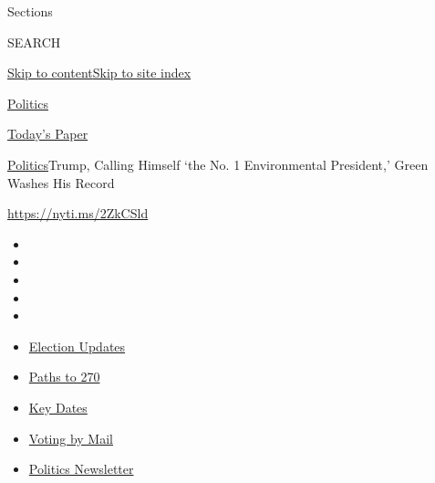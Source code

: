Sections

SEARCH

\protect\hyperlink{site-content}{Skip to
content}\protect\hyperlink{site-index}{Skip to site index}

\href{https://www.nytimes3xbfgragh.onion/section/politics}{Politics}

\href{https://myaccount.nytimes3xbfgragh.onion/auth/login?response_type=cookie\&client_id=vi}{}

\href{https://www.nytimes3xbfgragh.onion/section/todayspaper}{Today's
Paper}

\href{/section/politics}{Politics}\textbar{}Trump, Calling Himself `the
No. 1 Environmental President,' Green Washes His Record

\url{https://nyti.ms/2ZkCSld}

\begin{itemize}
\item
\item
\item
\item
\item
\end{itemize}

\begin{itemize}
\item
  \href{https://www.nytimes3xbfgragh.onion/live/2020/09/11/us/trump-vs-biden?action=click\&pgtype=Article\&state=default\&region=TOP_BANNER\&context=storylines_menu}{Election
  Updates}
\item
  \href{https://www.nytimes3xbfgragh.onion/interactive/2020/us/elections/election-states-biden-trump.html?action=click\&pgtype=Article\&state=default\&region=TOP_BANNER\&context=storylines_menu}{Paths
  to 270}
\item
  \href{https://www.nytimes3xbfgragh.onion/interactive/2019/us/elections/2020-presidential-election-calendar.html?action=click\&pgtype=Article\&state=default\&region=TOP_BANNER\&context=storylines_menu}{Key
  Dates}
\item
  \href{https://www.nytimes3xbfgragh.onion/interactive/2020/08/31/us/politics/vote-by-mail-deadlines.html?action=click\&pgtype=Article\&state=default\&region=TOP_BANNER\&context=storylines_menu}{Voting
  by Mail}
\item
  \href{https://www.nytimes3xbfgragh.onion/newsletters/politics?action=click\&pgtype=Article\&state=default\&region=TOP_BANNER\&context=storylines_menu}{Politics
  Newsletter}
\end{itemize}

